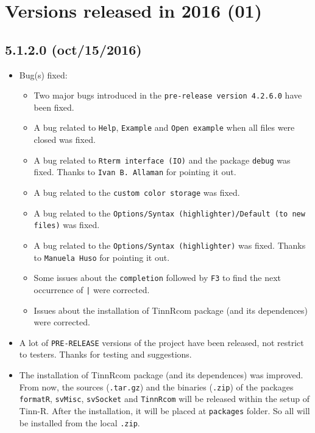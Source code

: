 
\hypertarget{2016}{}
\section{Versions released in 2016 (01)}

\subsection*{5.1.2.0 (oct/15/2016)}
\begin{itemize}
  \item Bug(s) fixed:
    \begin{itemize}
      \item Two major bugs introduced in the \texttt{pre-release version 4.2.6.0} have been fixed.
      \item A bug related to \texttt{Help}, \texttt{Example} and \texttt{Open example}
        when all files were closed was fixed.
      \item A bug related to \texttt{Rterm interface (IO)} and the package \texttt{debug} was fixed.
        Thanks to \texttt{Ivan B. Allaman} for pointing it out.
      \item A bug related to the \texttt{custom color storage} was fixed.
      \item A bug related to the \texttt{Options/Syntax (highlighter)/Default (to new files)} was fixed.
      \item A bug related to the \texttt{Options/Syntax (highlighter)} was fixed.
        Thanks to \texttt{Manuela Huso} for pointing it out.
      \item Some issues about the \texttt{completion} followed by \texttt{F3}
        to find the next occurrence of \texttt{|} were corrected.
      \item Issues about the installation of TinnRcom package (and its dependences) were corrected.
    \end{itemize}
  \item A lot of \texttt{PRE-RELEASE} versions of the project have been released, not restrict to testers. Thanks for testing and suggestions.
  \item The installation of TinnRcom package (and its dependences) was improved. From now, the sources (\texttt{.tar.gz}) and
    the binaries (\texttt{.zip}) of the packages \texttt{formatR}, \texttt{svMisc}, \texttt{svSocket} and \texttt{TinnRcom}
    will be released within the setup of Tinn-R. After the installation, it will be placed at \texttt{packages} folder.
    So all will be installed from the local \texttt{.zip}.

\end{itemize}
